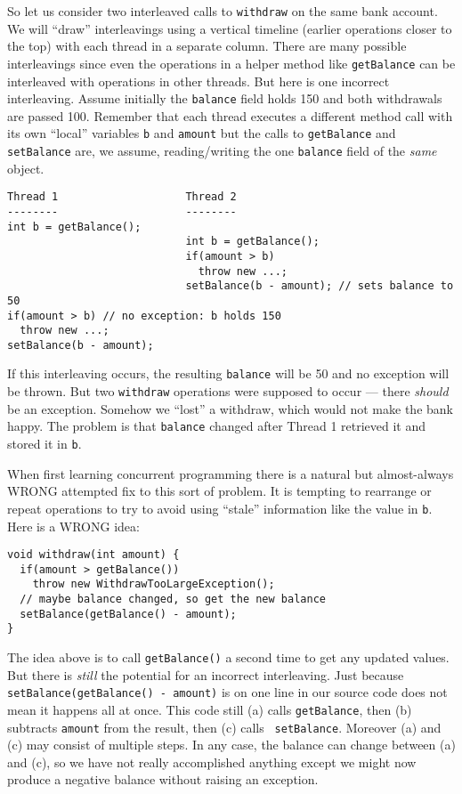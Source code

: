 \documentclass[10pt]{article}
\begin{document}
So let us consider two interleaved calls to {\tt withdraw} on the same
bank account.  We will ``draw'' interleavings using a vertical
timeline (earlier operations closer to the top) with each thread in a
separate column.  There are many possible interleavings since even the
operations in a helper method like {\tt getBalance} can be interleaved
with operations in other threads.  But here is one incorrect
interleaving.  Assume initially the {\tt balance} field holds 150 and
both withdrawals are passed 100.  Remember that each thread executes a
different method call with its own ``local'' variables {\tt b} and
{\tt amount} but the calls to {\tt getBalance} and {\tt setBalance}
are, we assume, reading/writing the one {\tt balance} field of the
\emph{same} object.

\begin{verbatim}
Thread 1                    Thread 2
--------                    --------
int b = getBalance();
                            int b = getBalance();
                            if(amount > b)
                              throw new ...;
                            setBalance(b - amount); // sets balance to 50
if(amount > b) // no exception: b holds 150
  throw new ...;
setBalance(b - amount);
\end{verbatim}

If this interleaving occurs, the resulting {\tt balance} will be 50
and no exception will be thrown.  But two {\tt withdraw} operations
were supposed to occur --- there \emph{should} be an exception.
Somehow we ``lost'' a withdraw, which would not make the bank happy.
The problem is that {\tt balance} changed after Thread 1 retrieved it
and stored it in {\tt b}.

When first learning concurrent programming there is a natural but
almost-always WRONG attempted fix to this sort of problem.  It is tempting
to rearrange or repeat operations to try to avoid using ``stale''
information like the value in {\tt b}.  Here is a WRONG idea:
\begin{verbatim}
void withdraw(int amount) {
  if(amount > getBalance())
    throw new WithdrawTooLargeException();
  // maybe balance changed, so get the new balance
  setBalance(getBalance() - amount);
}
\end{verbatim}
The idea above is to call {\tt getBalance()} a second time to get any
updated values.  But there is \emph{still} the potential for an
incorrect interleaving.  Just because {\tt setBalance(getBalance() -
  amount)} is on one line in our source code does not mean it happens
all at once.  This code still (a) calls {\tt getBalance}, then (b)
subtracts {\tt amount} from the result, then (c) calls {\tt
  setBalance}.  Moreover (a) and (c) may consist of multiple steps.
In any case, the balance can change between (a) and (c), so we have
not really accomplished anything except we might now produce a
negative balance without raising an exception.
\end{document}
